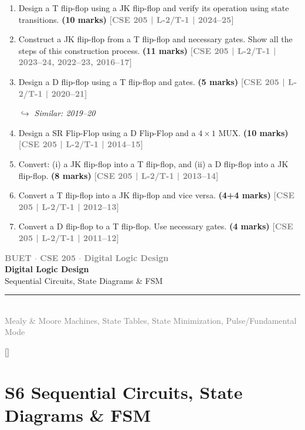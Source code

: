 \documentclass[12pt]{article}
\newcommand{\yr}[1]{\hfill\textcolor{gray}{\small\textbf{[#1]}}}
\newcommand{\mk}[1]{\textcolor{orange!70!black}{\small\textbf{(#1 marks)}}}
\newcommand{\variant}[1]{\par\vspace{1pt}\textcolor{blue!50!black}%
  {\footnotesize\textit{$\hookrightarrow$ Similar: #1}}}
\newcommand{\secdivider}[4]{%
  \newpage\thispagestyle{empty}%
  \vspace*{\fill}%
  \begin{tcolorbox}[enhanced,colback=#4!7,colframe=#3,boxrule=1.5pt,arc=8pt,
    left=20pt,right=20pt,top=22pt,bottom=22pt,
    shadow={3pt}{-3pt}{0pt}{black!15}]
    \centering
    {\large\textcolor{gray}{\textbf{BUET $\cdot$ CSE 205 $\cdot$ Digital Logic Design}}}\\[8pt]
    {\fontsize{26}{32}\selectfont\bfseries\textcolor{#3}{Digital Logic Design}}\\[6pt]
    {\fontsize{15}{19}\selectfont\textcolor{dgray}{#1}}\\[12pt]
    \textcolor{#3!60}{\rule{0.5\textwidth}{0.5pt}}\\[6pt]
    {\small\textcolor{gray}{#2}}
  \end{tcolorbox}%
  \vspace*{\fill}\newpage%
}
\begin{document}
\begin{enumerate}

\item Design a T flip-flop using a JK flip-flop and verify its operation using state transitions.
\mk{10} \yr{CSE 205 | L-2/T-1 | 2024--25}

\item Construct a JK flip-flop from a T flip-flop and necessary gates. Show all the steps of this construction process.
\mk{11} \yr{CSE 205 | L-2/T-1 | 2023--24, 2022--23, 2016--17}

\item Design a D flip-flop using a T flip-flop and gates.
\mk{5} \yr{CSE 205 | L-2/T-1 | 2020--21}
\variant{2019--20}

\item Design a SR Flip-Flop using a D Flip-Flop and a $4\times1$ MUX.
\mk{10} \yr{CSE 205 | L-2/T-1 | 2014--15}

\item Convert: (i) a JK flip-flop into a T flip-flop, and (ii) a D flip-flop into a JK flip-flop.
\mk{8} \yr{CSE 205 | L-2/T-1 | 2013--14}

\item Convert a T flip-flop into a JK flip-flop and vice versa.
\mk{4+4} \yr{CSE 205 | L-2/T-1 | 2012--13}

\item Convert a D flip-flop to a T flip-flop. Use necessary gates.
\mk{4} \yr{CSE 205 | L-2/T-1 | 2011--12}

\end{enumerate}


\secdivider{Sequential Circuits, State Diagrams \& FSM}{Mealy \& Moore Machines, State Tables, State Minimization, Pulse/Fundamental Mode}{cF}{teal}


\label{sec:S6}
\titleformat{\section}{\large\bfseries\color{cF}}{}{0em}{}[\titlerule]
\section{S6 \quad Sequential Circuits, State Diagrams \& FSM}
\end{document}
